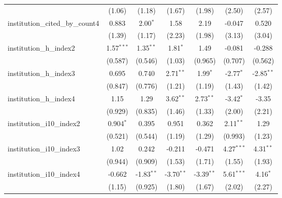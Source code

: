 \begin{tabular}{lcccccc}
                                         & (1.06)        & (1.18)        & (1.67)        & (1.98)        & (2.50)       & (2.57)\\   
   institution\_cited\_by\_count4        & 0.883         & 2.00$^{*}$    & 1.58          & 2.19          & -0.047       & 0.520\\   
                                         & (1.39)        & (1.17)        & (2.23)        & (1.98)        & (3.13)       & (3.04)\\   
   institution\_h\_index2                & 1.57$^{***}$  & 1.35$^{**}$   & 1.81$^{*}$    & 1.49          & -0.081       & -0.288\\   
                                         & (0.587)       & (0.546)       & (1.03)        & (0.965)       & (0.707)      & (0.562)\\   
   institution\_h\_index3                & 0.695         & 0.740         & 2.71$^{**}$   & 1.99$^{*}$    & -2.77$^{*}$  & -2.85$^{**}$\\   
                                         & (0.847)       & (0.776)       & (1.21)        & (1.19)        & (1.43)       & (1.42)\\   
   institution\_h\_index4                & 1.15          & 1.29          & 3.62$^{**}$   & 2.73$^{**}$   & -3.42$^{*}$  & -3.35\\   
                                         & (0.929)       & (0.835)       & (1.46)        & (1.33)        & (2.00)       & (2.21)\\   
   institution\_i10\_index2              & 0.904$^{*}$   & 0.395         & 0.951         & 0.362         & 2.11$^{**}$  & 1.29\\   
                                         & (0.521)       & (0.544)       & (1.19)        & (1.29)        & (0.993)      & (1.23)\\   
   institution\_i10\_index3              & 1.02          & 0.242         & -0.211        & -0.471        & 4.27$^{***}$ & 4.31$^{**}$\\   
                                         & (0.944)       & (0.909)       & (1.53)        & (1.71)        & (1.55)       & (1.93)\\   
   institution\_i10\_index4              & -0.662        & -1.83$^{**}$  & -3.70$^{**}$  & -3.39$^{**}$  & 5.61$^{***}$ & 4.16$^{*}$\\   
                                         & (1.15)        & (0.925)       & (1.80)        & (1.67)        & (2.02)       & (2.27)\\   

\end{tabular}
